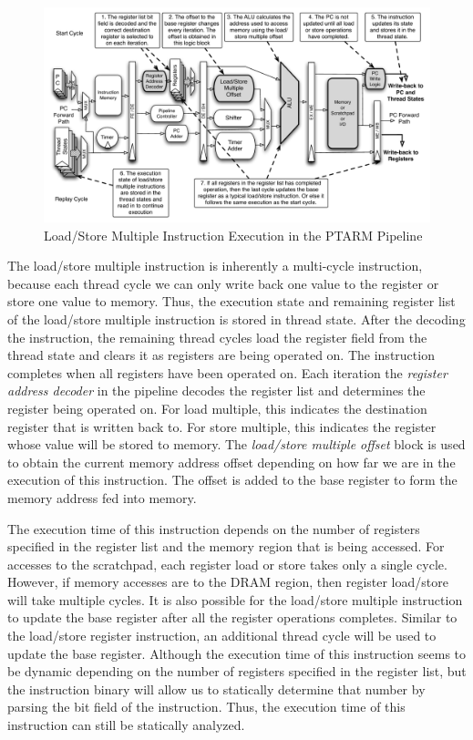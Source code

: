 \begin{figure}[h]
  \vspace{-15pt}
  \begin{center}
    \includegraphics[scale=.54]{figs/ldstrm_pipeline_implementation}
  \end{center}
  \vspace{-3mm}
  \caption{Load/Store Multiple Instruction Execution in the PTARM Pipeline}
  \label{fig:ldstrm_pipeline_implementation}
\end{figure}

The load/store multiple instruction is inherently a multi-cycle instruction, because each thread cycle we can only write back one value to the register or store one value to memory. 
Thus, the execution state and remaining register list of the load/store multiple instruction is stored in thread state.
After the decoding the instruction, the remaining thread cycles load the register field from the thread state and clears it as registers are being operated on. 
The instruction completes when all registers have been operated on.
Each iteration the \emph{register address decoder} in the pipeline decodes the register list and determines the register being operated on.
For load multiple, this indicates the destination register that is written back to.
For store multiple, this indicates the register whose value will be stored to memory.
The \emph{load/store multiple offset} block is used to obtain the current memory address offset depending on how far we are in the execution of this instruction.
The offset is added to the base register to form the memory address fed into memory.

The execution time of this instruction depends on the number of registers specified in the register list and the memory region that is being accessed. 
For accesses to the scratchpad, each register load or store takes only a single cycle. 
However, if memory accesses are to the DRAM region, then register load/store will take multiple cycles.
It is also possible for the load/store multiple instruction to update the base register after all the register operations completes. 
Similar to the load/store register instruction, an additional thread cycle will be used to update the base register.
Although the execution time of this instruction seems to be dynamic depending on the number of registers specified in the register list, but the instruction binary will allow us to statically determine that number by parsing the bit field of the instruction.
Thus, the execution time of this instruction can still be statically analyzed.   

